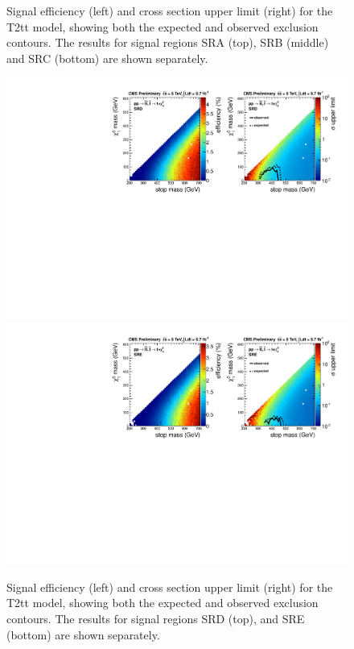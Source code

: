 \begin{figure}[hbt]
\begin{center}
    \caption{Signal efficiency (left) and cross section upper limit
      (right) for the T2tt model, showing both the expected and
      observed exclusion contours. The results for signal regions SRA (top),
      SRB (middle) and SRC (bottom) are shown separately.}
\label{fig:allsrlimits}
      \end{center}
\end{figure}

\begin{figure}[hbt]
  \begin{center}
        \includegraphics[width=1.\linewidth]{plots/T2tt_SRD.pdf}
        \includegraphics[width=1.\linewidth]{plots/T2tt_SRE.pdf}
    \caption{Signal efficiency (left) and cross section upper limit
      (right) for the T2tt model, showing both the expected and
      observed exclusion contours. The results for signal regions SRD (top),
      and SRE (bottom) are shown separately.}
\label{fig:allsrlimits2}
      \end{center}
\end{figure}

